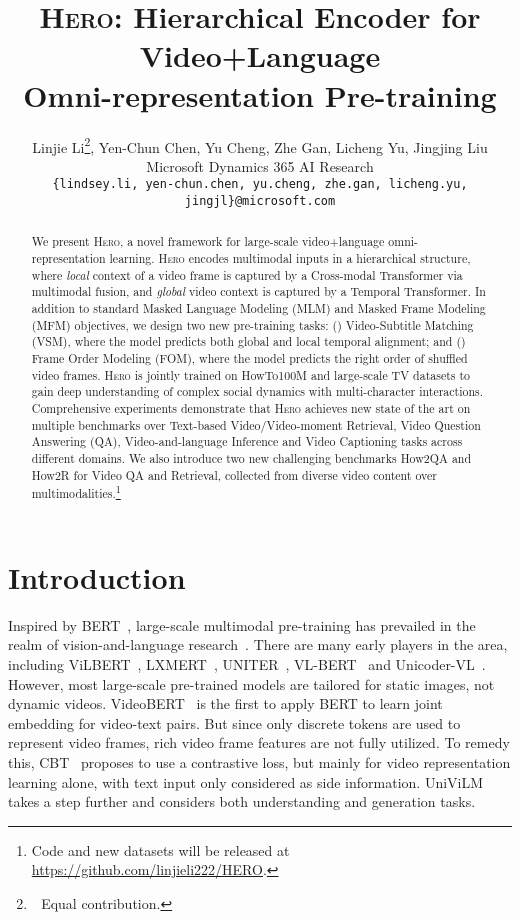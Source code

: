 \documentclass[11pt,a4paper]{article}
\title{\textsc{Hero}: Hierarchical Encoder for Video+Language \\ Omni-representation Pre-training}
\author{Linjie Li\thanks{\,\, Equal contribution.}, \hspace{0.03in} Yen-Chun Chen\footnotemark[1], \hspace{0.03in} Yu Cheng, \hspace{0.03in} Zhe Gan, \hspace{0.03in} Licheng Yu, \hspace{0.03in} Jingjing Liu\\
Microsoft Dynamics 365 AI Research\\
\small\tt{\{lindsey.li, yen-chun.chen, yu.cheng, zhe.gan, licheng.yu, jingjl\}@microsoft.com}}
\date{}
\begin{document}
\maketitle
\begin{abstract}
We present \textsc{Hero}, a novel framework for large-scale video+language omni-representation learning. \textsc{Hero} encodes multimodal inputs in a hierarchical structure, where \emph{local} context of a video frame is captured by a Cross-modal Transformer via multimodal fusion, and \emph{global} video context is captured by a Temporal Transformer. In addition to standard Masked Language Modeling (MLM) and Masked Frame Modeling (MFM) objectives, we design two new pre-training tasks: () Video-Subtitle Matching (VSM), where the model predicts both global and local temporal alignment; and () Frame Order Modeling (FOM), where the model predicts the right order of shuffled video frames. \textsc{Hero} is jointly trained on HowTo100M and large-scale TV datasets to gain deep understanding of complex social dynamics with multi-character interactions. Comprehensive experiments demonstrate that \textsc{Hero} achieves new state of the art on multiple benchmarks over Text-based Video/Video-moment Retrieval, Video Question Answering (QA), Video-and-language Inference and Video Captioning tasks across different domains. We also introduce two new challenging benchmarks How2QA and How2R for Video QA and Retrieval, collected from diverse video content over multimodalities.\footnote{Code and new datasets will be released at \url{https://github.com/linjieli222/HERO}.}
\end{abstract}

\section{Introduction}
\label{sec:intro}
Inspired by BERT~\cite{devlin2018bert}, large-scale multimodal pre-training has prevailed in the realm of vision-and-language research~\cite{lu2019vilbert,tan2019lxmert,chen2019uniter}.
There are many early players in the area, including ViLBERT~\citep{lu2019vilbert}, LXMERT~\citep{tan2019lxmert}, UNITER~\citep{chen2019uniter}, VL-BERT~\cite{su2019vl} and Unicoder-VL~\cite{li2019unicoder}. However, most large-scale pre-trained models are tailored for static images, not dynamic videos. 
VideoBERT~\cite{sun2019videobert} is the first to apply BERT to learn joint embedding for video-text pairs. But since only discrete tokens are used to represent video frames, rich video frame features are not fully utilized. To remedy this, CBT~\cite{sun2019contrastive} proposes to use a contrastive loss, but mainly for video representation learning alone, with text input only considered as side information. UniViLM~\cite{luo2020univilm} takes a step further and considers both understanding and generation tasks.
\end{document}
